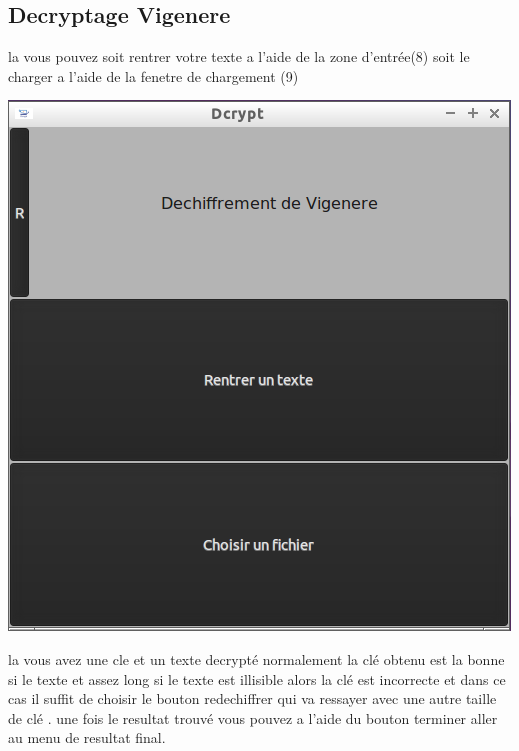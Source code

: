 \documentclass[a4]{article}
\begin{document}
		\subsection{Decryptage Vigenere}
			la vous pouvez soit rentrer votre texte a l'aide de la zone d'entrée(8)
			soit le charger a l'aide de la fenetre de chargement (9)
			\begin{center}\includegraphics[scale=0.4]{14.png}\end{center}
			la vous avez une cle et un texte decrypté normalement la clé obtenu est la bonne
			si le texte et assez long si le texte est illisible alors la clé est incorrecte et
			 dans ce cas il suffit de choisir le bouton redechiffrer qui va ressayer avec une 
			 autre taille de clé . une fois le resultat trouvé vous pouvez a l'aide du bouton 
			 terminer aller au menu de resultat final.  
\end{document}
